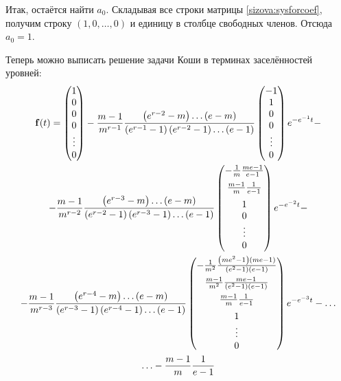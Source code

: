 Итак, остаётся найти $a_0$. Складывая все строки матрицы
\eqref{sizova:sysforcoef}, получим строку $(1, 0, \ldots, 0)$ и
единицу в столбце свободных членов. Отсюда $a_0 = 1$.

Теперь можно выписать решение задачи Коши в терминах заселённостей
уровней:
\begin{multline}
\bold f (t) = \begin{pmatrix}
1\\0\\0\\0\\
\vdots\\0\end{pmatrix} - \frac{m - 1}{m^{r - 1}} \frac{\left(e^{r
- 2} - m\right) \ldots (e - m)}{\left(e^{r - 1} - 1\right)
\left(e^{r - 2} - 1\right)
\ldots (e - 1)} \begin{pmatrix}
-1\\1\\0\\0\\
\vdots\\0
\end{pmatrix} 
e^{-e^{-1}t} -
\\
- \frac{m - 1}{m^{r - 2}} \frac{\left(e^{r - 3} - m\right) \ldots
(e - m)}{\left(e^{r - 2} - 1\right) \left(e^{r - 3} - 1\right)
\ldots (e - 1)}
\begin{pmatrix}
-\frac{1}{m}\frac{me - 1}{e - 1} \\[2mm]
 \frac{m - 1}{m}\frac{1}{e - 1}\\[2mm] 
 1\\0\\
\vdots\\0\end{pmatrix} e^{-e^{-2}t} - \\
- \frac{m - 1}{m^{r - 3}} \frac{\left(e^{r - 4} - m\right) \ldots
(e - m)}{\left(e^{r - 3} - 1\right) \left(e^{r - 4} - 1\right)
\ldots (e - 1)}
\begin{pmatrix}
 -\frac{1}{m^2}\frac{\left(me^{2} -
1\right) (me - 1)}{\left(e^{2} - 1\right) (e - 1)}\\[2mm]
\frac{m -
1}{m^2}\frac{me - 1}{\left(e^{2} - 1\right) (e - 1)}\\[2mm]
\frac{m - 1}{m}\frac{1}{e - 1}\\[2mm]
1\\ \vdots\\0\end{pmatrix}
e^{-e^{-3}t} -\ldots \\
\ldots - \frac{m - 1}{m} \frac{1}{e - 1}

\end{multline}
